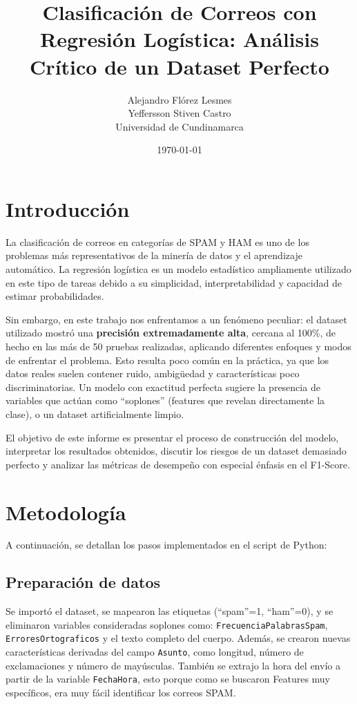 \documentclass[12pt,a4paper]{article}
\title{Clasificación de Correos con Regresión Logística: Análisis Crítico de un Dataset Perfecto}
\author{Alejandro Flórez Lesmes \\ 
        Yeffersson Stiven Castro \\
        Universidad de Cundinamarca}
\date{\today}
\begin{document}
\maketitle

\section{Introducción}
La clasificación de correos en categorías de SPAM y HAM es uno de los problemas más representativos de la minería de datos y el aprendizaje automático. La regresión logística es un modelo estadístico ampliamente utilizado en este tipo de tareas debido a su simplicidad, interpretabilidad y capacidad de estimar probabilidades.

Sin embargo, en este trabajo nos enfrentamos a un fenómeno peculiar: el dataset utilizado mostró una \textbf{precisión extremadamente alta}, cercana al 100\%, de hecho en las más de 50 pruebas realizadas, aplicando diferentes enfoques y modos de enfrentar el problema. Esto resulta poco común en la práctica, ya que los datos reales suelen contener ruido, ambigüedad y características poco discriminatorias. Un modelo con exactitud perfecta sugiere la presencia de variables que actúan como ``soplones'' (features que revelan directamente la clase), o un dataset artificialmente limpio.

El objetivo de este informe es presentar el proceso de construcción del modelo, interpretar los resultados obtenidos, discutir los riesgos de un dataset demasiado perfecto y analizar las métricas de desempeño con especial énfasis en el F1-Score.

\section{Metodología}
A continuación, se detallan los pasos implementados en el script de Python:

\subsection{Preparación de datos}
Se importó el dataset, se mapearon las etiquetas (``spam''=1, ``ham''=0), y se eliminaron variables consideradas soplones como: \texttt{FrecuenciaPalabrasSpam}, \texttt{ErroresOrtograficos} y el texto completo del cuerpo. Además, se crearon nuevas características derivadas del campo \texttt{Asunto}, como longitud, número de exclamaciones y número de mayúsculas. También se extrajo la hora del envío a partir de la variable \texttt{FechaHora}, esto porque como se buscaron Features muy específicos, era muy fácil identificar los correos SPAM.
\end{document}
